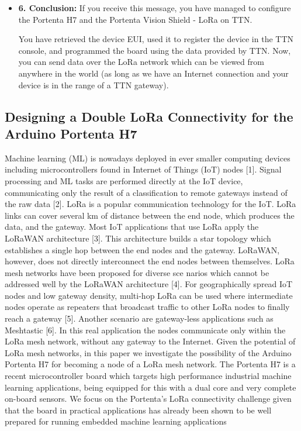 \begin{itemize}
		\item \textbf{6. Conclusion:} If you receive this message, you have managed to configure the Portenta H7 and the Portenta Vision Shield - LoRa on TTN.
		
		You have retrieved the device EUI, used it to register the device in the TTN console, and programmed the board using the data provided by TTN. Now, you can send data over the LoRa network which can be viewed from anywhere in the world (as long as we have an Internet connection and your device is in the range of a TTN gateway). \cite{ArduinoTTN:2024}
		
	\end{itemize}
	
	


\subsection{Designing a Double LoRa Connectivity for the Arduino Portenta H7}
\label{P2P}

 Machine learning (ML) is nowadays deployed in ever smaller
computing devices including microcontrollers found in Internet
of Things (IoT) nodes [1]. Signal processing and ML tasks
are performed directly at the IoT device, communicating only
the result of a classification to remote gateways instead of the
raw data [2].
LoRa is a popular communication technology for the IoT.
LoRa links can cover several km of distance between the end
node, which produces the data, and the gateway. Most IoT
applications that use LoRa apply the LoRaWAN architecture
[3]. This architecture builds a star topology which establishes a
single hop between the end nodes and the gateway. LoRaWAN,
however, does not directly interconnect the end nodes between
themselves. \cite{PortentaLANMAN2022}
\newline
LoRa mesh networks have been proposed for diverse sce
narios which cannot be addressed well by the LoRaWAN
architecture [4]. For geographically spread IoT nodes and
low gateway density, multi-hop LoRa can be used where
intermediate nodes operate as repeaters that broadcast traffic
to other LoRa nodes to finally reach a gateway [5]. Another
scenario are gateway-less applications such as Meshtastic [6].
In this real application the nodes communicate only within the
LoRa mesh network, without any gateway to the Internet.
Given the potential of LoRa mesh networks, in this paper
we investigate the possibility of the Arduino Portenta H7 for
becoming a node of a LoRa mesh network. The Portenta H7 is
a recent microcontroller board which targets high performance
 industrial machine learning applications, being equipped for
this with a dual core and very complete on-board sensors. We
focus on the Portenta’s LoRa connectivity challenge given that
the board in practical applications has already been shown
to be well prepared for running embedded machine learning
applications \cite{PortentaLANMAN2022}\newline

